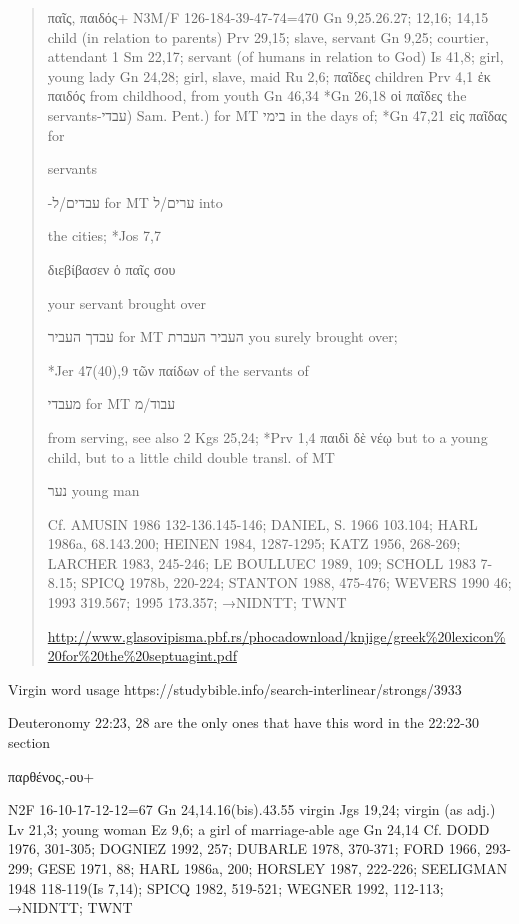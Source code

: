 \documentclass[11pt]{article}
\begin{document}
\begin{quote}
\begin{greek} παῖς, παιδός+ N3M/F 126-184-39-47-74=470
Gn 9,25.26.27; 12,16; 14,15
child (in relation to parents) Prv 29,15; slave, servant Gn 9,25; courtier, attendant 1 Sm 22,17; servant
(of humans in relation to God) Is 41,8; girl, young lady Gn 24,28; girl, slave, maid Ru 2,6; παῖδες
children Prv 4,1
ἐκ παιδός from childhood, from youth Gn 46,34
*Gn 26,18 οἱ παῖδες the servants-עבדי) Sam. Pent.) for MT בימי in the days of; *Gn 47,21 εἰς παῖδας for \end{greek}
servants\begin{hebrew} -עבדים/ל for MT ערים/ל into \end{hebrew} the cities; *Jos 7,7 \begin{greek} διεβίβασεν ὁ παῖς σου \end{greek} your servant brought over
\begin{hebrew}
 עבדך
העביר for MT העביר העברת you surely brought over; 
 \end{hebrew}
\begin{greek}  *Jer 47(40),9 τῶν παίδων of the servants of \end{greek}
\begin{hebrew}
  מעבדי
for MT עבוד/מ 
\end{hebrew}
\begin{greek}
from serving, see also 2 Kgs 25,24; *Prv 1,4 παιδὶ δὲ νέῳ but to a young child, but to
a little child double transl. of MT
\end{greek}
\begin{hebrew}
 נער young man
\end{hebrew}
Cf. AMUSIN 1986 132-136.145-146; DANIEL, S. 1966 103.104; HARL 1986a, 68.143.200; HEINEN 1984,
1287-1295; KATZ 1956, 268-269; LARCHER 1983, 245-246; LE BOULLUEC 1989, 109; SCHOLL 1983 7-
8.15; SPICQ 1978b, 220-224; STANTON 1988, 475-476; WEVERS 1990 46; 1993 319.567; 1995 173.357;
→NIDNTT; TWNT 

\url{http://www.glasovipisma.pbf.rs/phocadownload/knjige/greek\%20lexicon\%20for\%20the\%20septuagint.pdf}
\end{quote}


Virgin word usage https://studybible.info/search-interlinear/strongs/3933

 Deuteronomy 22:23, 28 are the only ones that have this word in the 22:22-30 section

\begin{greek}
παρθένος,-ου+ \end{greek} N2F 16-10-17-12-12=67
Gn 24,14.16(bis).43.55
virgin Jgs 19,24; virgin (as adj.) Lv 21,3; young woman Ez 9,6; a girl of marriage-able age Gn 24,14
Cf. DODD 1976, 301-305; DOGNIEZ 1992, 257; DUBARLE 1978, 370-371; FORD 1966, 293-299; GESE
1971, 88; HARL 1986a, 200; HORSLEY 1987, 222-226; SEELIGMAN 1948 118-119(Is 7,14); SPICQ 1982,
519-521; WEGNER 1992, 112-113; →NIDNTT; TWNT
\end{document}
